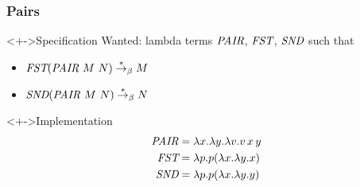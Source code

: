 \documentclass[pdftex,aspectratio=169]{beamer}
\begin{document}
\begin{frame}
  \frametitle{Pairs}
  \begin{exampleblock}<+->{Specification}
    Wanted: lambda terms $\textit{PAIR}$, $\textit{FST}$, $\textit{SND}$ such that
    \begin{itemize}
    \item $\textit{FST} (\textit{PAIR}~M~N) \stackrel\ast\rightarrow_\beta M$
    \item $\textit{SND} (\textit{PAIR}~M~N) \stackrel\ast\rightarrow_\beta N$
    \end{itemize}
  \end{exampleblock}
  \begin{alertblock}<+->{Implementation}\VSPBLS
    \begin{align*}
      \textit{PAIR} &= \lambda x.\lambda y. \lambda v. v\,x\,y \\
      \textit{FST}  &= \lambda p. p (\lambda x.\lambda y. x) \\
      \textit{SND}  &= \lambda p. p (\lambda x.\lambda y. y)
    \end{align*}
  \end{alertblock}
\end{frame}
\end{document}
